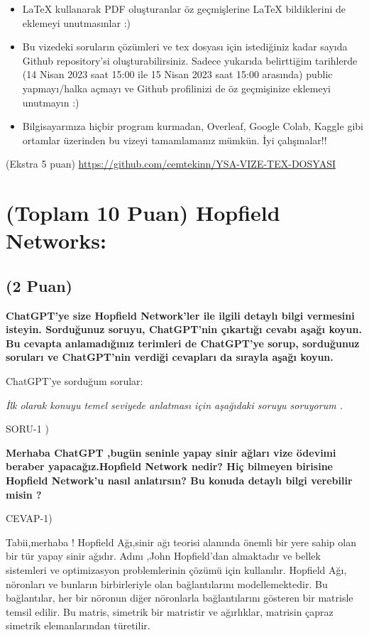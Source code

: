 \documentclass[11pt]{article}
\begin{document}
\begin{itemize}
    \item LaTeX kullanarak PDF oluşturanlar öz geçmişlerine LaTeX bildiklerini de eklemeyi unutmasınlar :)
    \item Bu vizedeki soruların çözümleri ve tex dosyası için istediğiniz kadar sayıda Github repository'si oluşturabilirsiniz. Sadece yukarıda belirttiğim tarihlerde (14 Nisan 2023 saat 15:00 ile 15 Nisan 2023 saat 15:00 arasında) public yapmayı/halka açmayı ve Github profilinizi de öz geçmişinize eklemeyi unutmayın :)
    \item Bilgisayarınıza hiçbir program kurmadan, Overleaf, Google Colab, Kaggle gibi ortamlar üzerinden bu vizeyi tamamlamanız mümkün. İyi çalışmalar!!
\end{itemize}

(Ekstra 5 puan) \url{https://github.com/cemtekinn/YSA-VIZE-TEX-DOSYASI}

\newpage
\section{(Toplam 10 Puan) Hopfield Networks:}

\subsection{(2 Puan)} \textbf{ChatGPT’ye size Hopfield Network’ler ile ilgili detaylı bilgi vermesini isteyin. Sorduğunuz soruyu, ChatGPT'nin çıkartığı cevabı aşağı koyun. Bu cevapta anlamadığınız terimleri de ChatGPT’ye sorup, sorduğunuz soruları ve ChatGPT’nin verdiği cevapları da sırayla aşağı koyun.}

ChatGPT'ye sorduğum sorular: 

\textit{İlk olarak konuyu temel seviyede anlatması için aşağıdaki soruyu soruyorum .}

SORU-1 )

\textbf{Merhaba ChatGPT ,bugün seninle yapay sinir ağları vize ödevimi beraber yapacağız.Hopfield Network nedir? Hiç bilmeyen birisine Hopfield Network'u nasıl anlatırsın? Bu konuda detaylı bilgi verebilir misin ?}

CEVAP-1)

Tabii,merhaba ! Hopfield Ağı,sinir ağı teorisi alanında önemli bir yere sahip olan bir tür yapay sinir ağıdır. Adını ,John Hopfield'dan almaktadır ve bellek sistemleri ve optimizasyon problemlerinin çözümü için kullanılır.
Hopfield Ağı, nöronları ve bunların birbirleriyle olan bağlantılarını modellemektedir. Bu bağlantılar, her bir nöronun diğer nöronlarla bağlantılarını gösteren bir matrisle temsil edilir. Bu matris, simetrik bir matristir ve ağırlıklar, matrisin çapraz simetrik elemanlarından türetilir.
\end{document}
